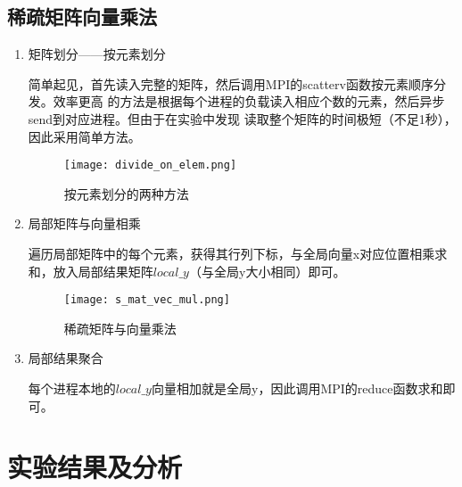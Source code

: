 \documentclass[UTF8,a4paper,12pt]{article}
\begin{document}
\subsection{稀疏矩阵向量乘法}
\begin{enumerate}[itemindent=0.5em,label=\arabic*、]
  \item 矩阵划分——按元素划分
  \par 简单起见，首先读入完整的矩阵，然后调用MPI的scatterv函数按元素顺序分发。效率更高
  的方法是根据每个进程的负载读入相应个数的元素，然后异步send到对应进程。但由于在实验中发现
  读取整个矩阵的时间极短（不足1秒），因此采用简单方法。
  \begin{figure}[h]
  \begin{center}
  \texttt{[image: divide\_on\_elem.png]} %
  \caption{按元素划分的两种方法}
  \end{center}
  \end{figure}
  \item 局部矩阵与向量相乘
  \par 遍历局部矩阵中的每个元素，获得其行列下标，与全局向量x对应位置相乘求和，放入局部结果矩阵$local\_y$（与全局y大小相同）即可。
  \begin{figure}[h]
  \begin{center}
  \texttt{[image: s\_mat\_vec\_mul.png]} %
  \caption{稀疏矩阵与向量乘法}
  \end{center}
  \end{figure}
  \item 局部结果聚合
  \par 每个进程本地的$local\_y$向量相加就是全局y，因此调用MPI的reduce函数求和即可。
\end{enumerate}

\section{实验结果及分析}
\end{document}
